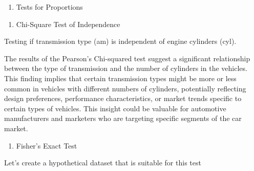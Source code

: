 \documentclass[
]{book}
\newenvironment{Shaded}{\begin{snugshade}}{\end{snugshade}}
\newcommand{\CommentTok}[1]{\textcolor[rgb]{0.56,0.35,0.01}{\textit{#1}}}
\newcommand{\FunctionTok}[1]{\textcolor[rgb]{0.13,0.29,0.53}{\textbf{#1}}}
\newcommand{\NormalTok}[1]{#1}
\newcommand{\OtherTok}[1]{\textcolor[rgb]{0.56,0.35,0.01}{#1}}
\newcommand{\SpecialCharTok}[1]{\textcolor[rgb]{0.81,0.36,0.00}{\textbf{#1}}}
\providecommand{\tightlist}{%
  \setlength{\itemsep}{0pt}\setlength{\parskip}{0pt}}
\begin{document}
\begin{enumerate}
\def\labelenumi{\arabic{enumi}.}
\setcounter{enumi}{2}
\tightlist
\item
  Tests for Proportions
\end{enumerate}

\begin{enumerate}
\def\labelenumi{\alph{enumi}.}
\tightlist
\item
  Chi-Square Test of Independence
\end{enumerate}

Testing if transmission type (am) is independent of engine cylinders (cyl).

\begin{Shaded}
\end{Shaded}

The results of the Pearson's Chi-squared test suggest a significant relationship between the type of transmission and the number of cylinders in the vehicles. This finding implies that certain transmission types might be more or less common in vehicles with different numbers of cylinders, potentially reflecting design preferences, performance characteristics, or market trends specific to certain types of vehicles. This insight could be valuable for automotive manufacturers and marketers who are targeting specific segments of the car market.

\begin{enumerate}
\def\labelenumi{\alph{enumi}.}
\setcounter{enumi}{1}
\tightlist
\item
  Fisher's Exact Test
\end{enumerate}

Let's create a hypothetical dataset that is suitable for this test
\end{document}
